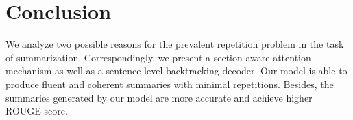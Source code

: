 \section{Conclusion}
\label{sec:conclude}
We analyze two possible reasons for the prevalent repetition problem in the task of summarization.
Correspondingly, we present a section-aware attention mechanism as well as a sentence-level backtracking decoder. Our model is able to produce fluent and coherent summaries with minimal repetitions.
Besides, the summaries generated by our model are more accurate and achieve higher ROUGE score. 

